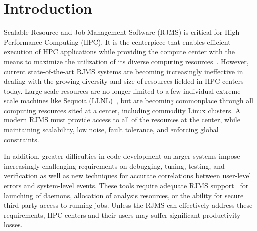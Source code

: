 \section{Introduction}

Scalable Resource and Job Management Software (RJMS) is critical
for High Performance Computing (HPC).
It is the centerpiece that enables efficient
execution of HPC applications while providing
the compute center with the means
to maximize the utilization of its diverse  
 computing resources~\cite{GeorgiouThesis}.
However, current state-of-the-art RJMS systems 
are becoming increasingly
ineffective in dealing with the growing diversity and size 
of resources fielded in HPC centers today. Large-scale 
resources are no longer limited to  
a few individual 
extreme-scale machines like Sequoia (LLNL)~\cite{sequoia}, %
but are becoming commonplace through all computing resources sited at a center, including
commodity Linux clusters.
A modern RJMS must provide access to all of the resources at the center,
while maintaining
scalability, low noise, fault tolerance, and enforcing global constraints.

In addition, greater difficulties in code development
on larger systems impose increasingly challenging
requirements on 
debugging, tuning, testing, and verification
as well as new techniques for 
accurate correlations between user-level errors
and system-level events.
These tools
require adequate RJMS support~\cite{STAT,SPINDLE,PRUNER,SCR,launchmon}
for launching of daemons, allocation of analysis resources, or the ability
for secure third party access to running jobs.
Unless the RJMS can effectively
address these requirements, HPC centers and their users 
may suffer significant productivity losses.

